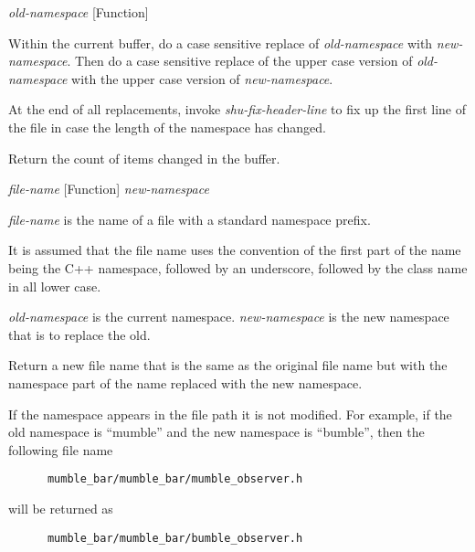 \vspace{1em}
\noindent
{}
\usebox{\funcname}\emph{old-namespace}
 \hfill [Function]
\hspace*{\wd\funcname}

\begin{doc-string}
Within the current buffer, do a case sensitive replace of \emph{old-namespace} with
\emph{new-namespace}.  Then do a case sensitive replace of the upper case version of
\emph{old-namespace} with the upper case version of \emph{new-namespace}.

At the end of all replacements, invoke \emph{shu-fix-header-line} to fix up the first
line of the file in case the length of the namespace has changed.

Return the count of items changed in the buffer.
\end{doc-string}

\vspace{1em}
\noindent
{}
\usebox{\funcname}\emph{file-name}
 \hfill [Function]
\hspace*{\wd\funcname}\emph{new-namespace}

\begin{doc-string}
\emph{file-name} is the name of a file with a standard namespace prefix.

It is assumed that the file name uses the convention of the first part of the
name being the C++ namespace, followed by an underscore, followed by the class
name in all lower case.

\emph{old-namespace} is the current namespace.  \emph{new-namespace} is the new namespace that
is to replace the old.

Return a new file name that is the same as the original file name but with the
namespace part of the name replaced with the new namespace.

If the namespace appears in the file path it is not modified.  For example, if
the old namespace is ``mumble'' and the new namespace is ``bumble'', then the
following file name

\small{\begin{verbatim}
      mumble_bar/mumble_bar/mumble_observer.h
\end{verbatim}}

will be returned as

\small{\begin{verbatim}
      mumble_bar/mumble_bar/bumble_observer.h
\end{verbatim}}
\end{doc-string}

